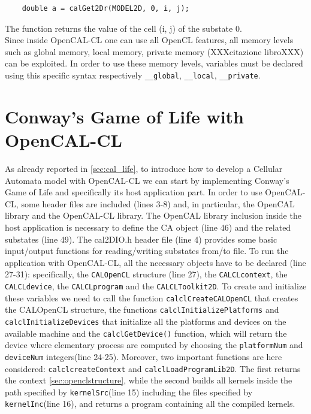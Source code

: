 \begin{lstlisting} 
	double a = calGet2Dr(MODEL2D, 0, i, j);
\end{lstlisting}

The function returns the value of the cell (i, j) of the substate 0.\\ Since inside OpenCAL-CL one can use all OpenCL features, all memory levels such as global memory, local memory, private
memory (XXXcitazione libroXXX) can be exploited. In order to use these memory levels, variables must be declared using this specific syntax respectively
\verb'__global', \verb'__local', \verb'__private'.

\section{Conway's Game of Life with OpenCAL-CL}
 
As already reported in \ref{sec:cal_life}, to introduce how to develop a
Cellular Automata model with OpenCAL-CL we can start by implementing Conway’s
Game of Life and specifically its host application part. In order to use OpenCAL-CL, some
header files are included (lines 3-8) and, in particular, the OpenCAL library and
the OpenCAL-CL library. The OpenCAL library
inclusion inside the host application is necessary to define the CA object
(line 46) and the related substates (line 49). The cal2DIO.h header
file (line 4) provides some basic input/output functions for
reading/writing substates from/to file. To run the application with
OpenCAL-CL, all the necessary objects have to be declared (line
27-31): specifically, the
\verb'CALOpenCL' structure (line 27), the \verb'CALCLcontext', the
\verb'CALCLdevice', the \verb'CALCLprogram' and the
\verb'CALCLToolkit2D'.  To create and initialize these variables we
need to call the function \verb'calclCreateCALOpenCL' that creates the
CALOpenCL structure, the functions \verb|calclInitializePlatforms| and
\verb|calclInitializeDevices| that initialize all the platforms and
devices on the available machine and the \verb'calclGetDevice()' function, which
will return the device where elementary process are computed by
choosing the \verb'platformNum' and \verb'deviceNum' integers(line
24-25).  Moreover, two important functions are here considered: \verb'calclcreateContext'
and \verb'calclLoadProgramLib2D'. The first returns the context
\ref{sec:openclstructure}, while the second builds all kernels inside the
path specified by \verb'kernelSrc'(line 15) including the files
specified by \verb'kernelInc'(line 16), and returns a program
containing all the compiled kernels.

